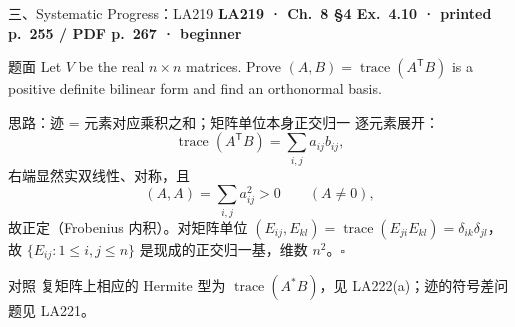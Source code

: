 \documentclass[aspectratio=169,10pt,fontset=none]{ctexbeamer}
\newcommand{\ex}[1]{\textcolor{accent}{\footnotesize\bfseries #1}}
\begin{document}
\begin{frame}[t]{三、Systematic Progress：LA219}
  \leavevmode\ex{LA219 · Ch.~8 §4 Ex.~4.10 · printed p.~255 / PDF p.~267 · beginner}
  \begin{block}{\footnotesize 题面}
    \scriptsize Let $V$ be the real $n\times n$ matrices. Prove $(A,B)=\operatorname{trace}(A^{\mathsf T}B)$ is a positive definite bilinear form and find an orthonormal basis.
  \end{block}
  \begin{exampleblock}{\footnotesize 思路：迹 = 元素对应乘积之和；矩阵单位本身正交归一}
    \scriptsize
    逐元素展开：
    $$\operatorname{trace}(A^{\mathsf T}B)=\sum_{i,j}a_{ij}b_{ij},$$
    右端显然实双线性、对称，且
    $$(A,A)=\sum_{i,j}a_{ij}^2>0\qquad(A\ne0),$$
    故正定（Frobenius 内积）。对矩阵单位 $(E_{ij},E_{kl})=\operatorname{trace}(E_{ji}E_{kl})=\delta_{ik}\delta_{jl}$，故 $\boxed{\{E_{ij}:1\le i,j\le n\}}$ 是现成的正交归一基，维数 $n^2$。$\square$
  \end{exampleblock}
  \begin{block}{\footnotesize 对照}
    \scriptsize 复矩阵上相应的 Hermite 型为 $\operatorname{trace}(A^*B)$，见 LA222(a)；迹的符号差问题见 LA221。
  \end{block}
\end{frame}
\end{document}
